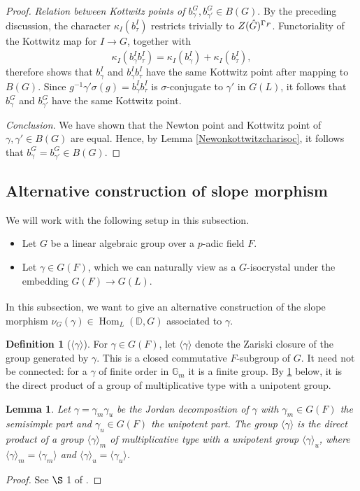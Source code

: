 \documentclass[11pt,a4paper]{article}
\theoremstyle{definition}
\newtheorem{D}[shared]{Definition}
\theoremstyle{plain}
\newtheorem{Le}[shared]{Lemma}
\theoremstyle{remark}
\theoremstyle{plain}
\DeclareMathOperator{\Hom}{Hom}
\begin{document}
\begin{proof}
    \textit{Relation between Kottwitz points of $b_{\gamma}^G, b_{\gamma'}^G \in B(G)$}. By the preceding discussion, the character $\kappa_I(b_{\tau}^I)$ restricts trivially to $Z(\Hat{G})^{\Gamma_F}$. Functoriality of the Kottwitz map for $I \xrightarrow[]{} G$, together with
    $$\kappa_I(b_{\gamma}^I b_{\tau}^I)=\kappa_I(b_{\gamma}^I)+\kappa_I(b_{\tau}^I),$$
    therefore shows that $b_{\gamma}^I$ and $b_{\gamma}^I b_{\tau}^I$ have the same Kottwitz point after mapping to $B(G)$. Since $g^{-1}\gamma'\sigma(g)=b_{\gamma}^I b_{\tau}^I$ is $\sigma$-conjugate to $\gamma'$ in $G(L)$, it follows that $b_{\gamma}^G$ and $b_{\gamma'}^G$ have the same Kottwitz point.

    \textit{Conclusion}. We have shown that the Newton point and Kottwitz point of $\gamma, \gamma' \in B(G)$ are equal. Hence, by Lemma \ref{Newonkottwitzcharisoc}, it follows that $b_{\gamma}^G = b_{\gamma'}^G \in B(G)$.
\end{proof}

\subsection{Alternative construction of slope morphism}
We will work with the following setup in this subsection.
\begin{itemize}
    \item Let $G$ be a linear algebraic group over a $p$-adic field $F$.
    \item Let $\gamma \in G(F)$, which we can naturally view as a $G$-isocrystal under the embedding $G(F) \xrightarrow[]{} G(L)$.
\end{itemize}

In this subsection, we want to give an alternative construction of the slope morphism $\nu_G(\gamma) \in \Hom_L(\mathbb{D},G)$ associated to $\gamma$.

\begin{D}[$\langle \gamma \rangle$]
    For $\gamma \in G(F)$, let $\langle \gamma \rangle$ denote the Zariski closure of the group generated by $\gamma$. This is a closed commutative $F$-subgroup of $G$. It need not be connected: for a $\gamma$ of finite order in $\mathbb{G}_m$ it is a finite group. By \ref{delignelemma} below, it is the direct product of a group of multiplicative type with a unipotent group.
\end{D}

\begin{Le}\label{delignelemma}
    Let $\gamma = \gamma_m\gamma_u$ be the Jordan decomposition of $\gamma$ with $\gamma_m \in G(F)$ the semisimple part and $\gamma_u \in G(F)$ the unipotent part. The group $\langle \gamma \rangle$ is the direct product of a group $\langle \gamma \rangle_m$ of multiplicative type with a unipotent group $\langle \gamma \rangle_u$, where $\langle \gamma \rangle_m = \langle \gamma_m \rangle$ and $\langle \gamma \rangle_u = \langle \gamma_u \rangle$.
\end{Le}
\begin{proof}
    See $\S$ 1 of \cite{MR425033}.
\end{proof}
\end{document}
